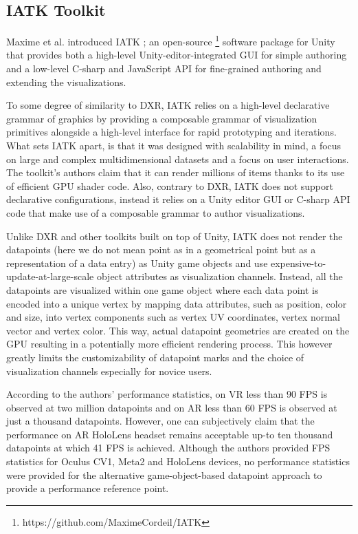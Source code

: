 \documentclass{vgtc}                          %
\begin{document}
\subsection{IATK Toolkit}
Maxime et al. introduced IATK \cite{iatk_toolkit}; an open-source
\footnote{https://github.com/MaximeCordeil/IATK} software
package for Unity that provides both a high-level Unity-editor-integrated GUI
for simple authoring and a low-level C-sharp and JavaScript API for
fine-grained authoring and extending the visualizations.

\smallskip

\noindent To some degree of similarity to DXR, IATK relies on a high-level
declarative grammar of graphics by providing a composable grammar of
visualization primitives alongside a high-level interface for rapid prototyping
and iterations. What sets IATK apart, is that it was designed with scalability
in mind, a focus on large and complex multidimensional datasets and a focus on
user interactions. The toolkit's authors claim that it can render millions of
items thanks to its use of efficient GPU shader code. Also, contrary to DXR,
IATK does not support declarative configurations, instead it relies on a Unity
editor GUI or C-sharp API code that make use of a composable grammar to author
visualizations.

\smallskip

\noindent Unlike DXR and other toolkits built on top of Unity, IATK does not
render the datapoints (here we do not mean point as in a geometrical point but
as a representation of a data entry) as Unity game objects and use
expensive-to-update-at-large-scale object attributes as visualization channels.
Instead, all the datapoints are visualized within one game object where each
data point is encoded into a unique vertex by mapping data attributes,
such as position, color and size, into vertex components such as vertex UV
coordinates, vertex normal vector and vertex color. This way, actual datapoint
geometries are created on the GPU resulting in a potentially more
efficient rendering process. This however greatly limits the customizability
of datapoint marks and the choice of visualization channels especially for
novice users.

\smallskip

\noindent According to the authors' performance statistics, on VR less than
90 FPS is observed at two million datapoints and on AR less than 60 FPS is
observed at just a thousand datapoints. However, one can subjectively claim
that the performance on AR HoloLens headset remains acceptable up-to ten
thousand datapoints at which 41 FPS is achieved. Although the authors provided
FPS statistics for Oculus CV1, Meta2 and HoloLens devices, no performance
statistics were provided for the alternative game-object-based datapoint
approach to provide a performance reference point.
\end{document}
